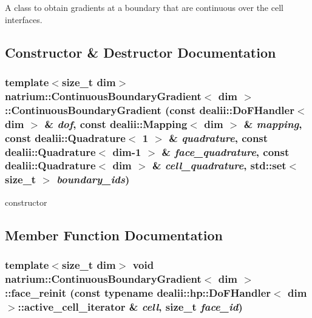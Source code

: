 A class to obtain gradients at a boundary that are continuous over the cell interfaces. 

\subsection{Constructor \& Destructor Documentation}
\hypertarget{classnatrium_1_1ContinuousBoundaryGradient_a50ea3e2b4baedabcca7514d3f7dddda7}{
\subsubsection[{ContinuousBoundaryGradient}]{\setlength{\rightskip}{0pt plus 5cm}template$<$size\_\-t dim$>$ {\bf natrium::ContinuousBoundaryGradient}$<$ dim $>$::{\bf ContinuousBoundaryGradient} (const dealii::DoFHandler$<$ dim $>$ \& {\em dof}, \/  const dealii::Mapping$<$ dim $>$ \& {\em mapping}, \/  const dealii::Quadrature$<$ 1 $>$ \& {\em quadrature}, \/  const dealii::Quadrature$<$ dim-\/1 $>$ \& {\em face\_\-quadrature}, \/  const dealii::Quadrature$<$ dim $>$ \& {\em cell\_\-quadrature}, \/  std::set$<$ size\_\-t $>$ {\em boundary\_\-ids})}}
\label{classnatrium_1_1ContinuousBoundaryGradient_a50ea3e2b4baedabcca7514d3f7dddda7}
constructor 

\subsection{Member Function Documentation}
\hypertarget{classnatrium_1_1ContinuousBoundaryGradient_a2345918a9418d4f53d2f52de71c17237}{
\subsubsection[{face\_\-reinit}]{\setlength{\rightskip}{0pt plus 5cm}template$<$size\_\-t dim$>$ void {\bf natrium::ContinuousBoundaryGradient}$<$ dim $>$::face\_\-reinit (const typename dealii::hp::DoFHandler$<$ dim $>$::active\_\-cell\_\-iterator \& {\em cell}, \/  size\_\-t {\em face\_\-id})}}
\label{classnatrium_1_1ContinuousBoundaryGradient_a2345918a9418d4f53d2f52de71c17237}


